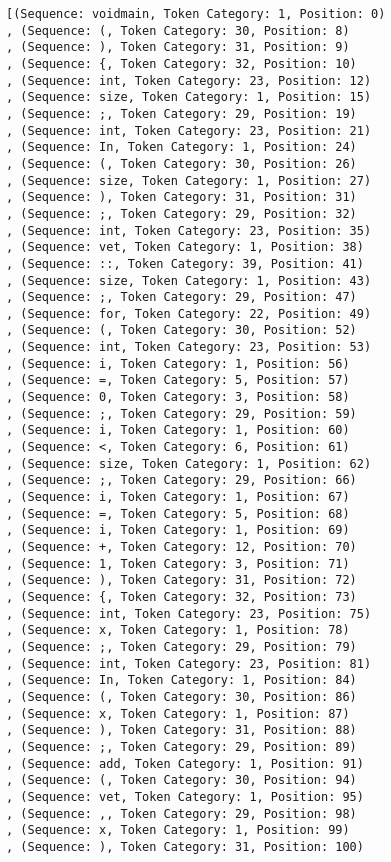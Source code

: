 \documentclass[a4paper, 12pt, article]{memoir}
\begin{document}
\begin{lstlisting}
[(Sequence: voidmain, Token Category: 1, Position: 0)
, (Sequence: (, Token Category: 30, Position: 8)
, (Sequence: ), Token Category: 31, Position: 9)
, (Sequence: {, Token Category: 32, Position: 10)
, (Sequence: int, Token Category: 23, Position: 12)
, (Sequence: size, Token Category: 1, Position: 15)
, (Sequence: ;, Token Category: 29, Position: 19)
, (Sequence: int, Token Category: 23, Position: 21)
, (Sequence: In, Token Category: 1, Position: 24)
, (Sequence: (, Token Category: 30, Position: 26)
, (Sequence: size, Token Category: 1, Position: 27)
, (Sequence: ), Token Category: 31, Position: 31)
, (Sequence: ;, Token Category: 29, Position: 32)
, (Sequence: int, Token Category: 23, Position: 35)
, (Sequence: vet, Token Category: 1, Position: 38)
, (Sequence: ::, Token Category: 39, Position: 41)
, (Sequence: size, Token Category: 1, Position: 43)
, (Sequence: ;, Token Category: 29, Position: 47)
, (Sequence: for, Token Category: 22, Position: 49)
, (Sequence: (, Token Category: 30, Position: 52)
, (Sequence: int, Token Category: 23, Position: 53)
, (Sequence: i, Token Category: 1, Position: 56)
, (Sequence: =, Token Category: 5, Position: 57)
, (Sequence: 0, Token Category: 3, Position: 58)
, (Sequence: ;, Token Category: 29, Position: 59)
, (Sequence: i, Token Category: 1, Position: 60)
, (Sequence: <, Token Category: 6, Position: 61)
, (Sequence: size, Token Category: 1, Position: 62)
, (Sequence: ;, Token Category: 29, Position: 66)
, (Sequence: i, Token Category: 1, Position: 67)
, (Sequence: =, Token Category: 5, Position: 68)
, (Sequence: i, Token Category: 1, Position: 69)
, (Sequence: +, Token Category: 12, Position: 70)
, (Sequence: 1, Token Category: 3, Position: 71)
, (Sequence: ), Token Category: 31, Position: 72)
, (Sequence: {, Token Category: 32, Position: 73)
, (Sequence: int, Token Category: 23, Position: 75)
, (Sequence: x, Token Category: 1, Position: 78)
, (Sequence: ;, Token Category: 29, Position: 79)
, (Sequence: int, Token Category: 23, Position: 81)
, (Sequence: In, Token Category: 1, Position: 84)
, (Sequence: (, Token Category: 30, Position: 86)
, (Sequence: x, Token Category: 1, Position: 87)
, (Sequence: ), Token Category: 31, Position: 88)
, (Sequence: ;, Token Category: 29, Position: 89)
, (Sequence: add, Token Category: 1, Position: 91)
, (Sequence: (, Token Category: 30, Position: 94)
, (Sequence: vet, Token Category: 1, Position: 95)
, (Sequence: ,, Token Category: 29, Position: 98)
, (Sequence: x, Token Category: 1, Position: 99)
, (Sequence: ), Token Category: 31, Position: 100)

\end{lstlisting}
\end{document}
